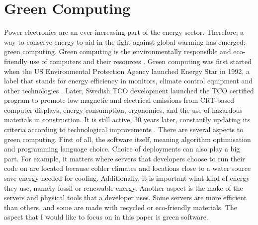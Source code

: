 \chapter{Green Computing}
\setcounter{page}{1}

Power electronics are an ever-increasing part of the energy sector. Therefore, a way to conserve energy to aid in the fight against global warming has emerged: green computing.
Green computing is the environmentally responsible and eco-friendly use of computers and their resources \cite{Salama20}. Green computing was first started when the US Environmental Protection Agency launched Energy Star in 1992, a label that stands for energy efficiency in monitors, climate control equipment and other technologies \cite{ENERGYSTAR}.
Later, Swedish TCO development launched the TCO certified program to promote low magnetic and electrical emissions from CRT-based computer displays, energy consumption, ergonomics, and the use of hazardous materials in construction. It is still active, 30 years later, constantly updating its criteria according to technological improvements \cite{TCOCertified}.
There are several aspects to green computing. First of all, the software itself, meaning algorithm optimisation and programming language choice. Choice of deployments can also play a big part. For example, it matters where servers that developers choose to run their code on are located because colder climates and locations close to a water source save energy needed for cooling. Additionally, it is important what kind of energy they use, namely fossil or renewable energy. Another aspect is the make of the servers and physical tools that a developer uses. Some servers are more efficient than others, and some are made with recycled or eco-friendly materials.
The aspect that I would like to focus on in this paper is green software.

